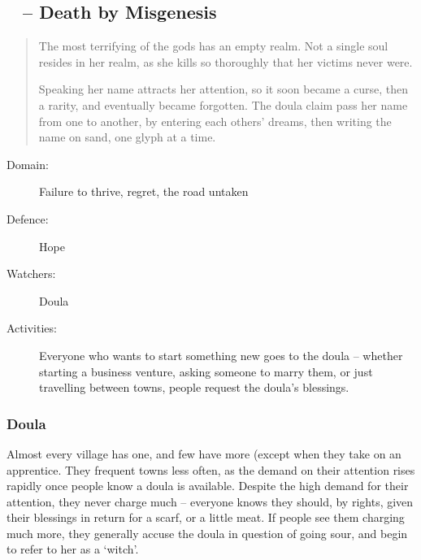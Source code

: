 \begin{multicols}{2}

\newcommand\guild[7]{
  \subsection[#1]{\textxswup~#1 -- Death by #2}
  \ifdefmacro{#1}{}{\index{#1}}
  \index{#2 (God)}
  \ifdefmacro{#6}{}{\index{#6}}
  \index{Gods}


  \begin{quotation}
  \noindent
  #3
  \end{quotation}

  \begin{minipage}{\linewidth}
  \begin{description}
  \item[Domain:] #4

  \item[Defence:] #5

  \item[Watchers:] #6

  \item[Activities:] #7

  \end{description}
  \end{minipage}

  \subsubsection{#6}
}


\guild{\hphantom{Nemo}}%
  {Misgenesis}%
  {The most terrifying of the gods has an empty realm.
  Not a single soul resides in her realm, as she kills so thoroughly that her victims never were.

  Speaking her name attracts her attention, so it soon became a curse, then a rarity, and eventually became forgotten.
  The doula claim pass her name from one to another, by entering each others' dreams, then writing the name on sand, one glyph at a time.
  }%
  {Failure to thrive, regret, the road untaken}%
  {Hope}%
  {Doula}%
  {Everyone who wants to start something new goes to the doula -- whether starting a business venture, asking someone to marry them, or just travelling between towns, people request the doula's blessings.
  }%

  Almost every village has one, and few have more (except when they take on an apprentice.
  They frequent towns less often, as the demand on their attention rises rapidly once people know a doula is available.
  Despite the high demand for their attention, they never charge much -- everyone knows they should, by rights, given their blessings in return for a scarf, or a little meat.
  If people see them charging much more, they generally accuse the doula in question of going sour, and begin to refer to her as a `witch'.


\end{multicols}
